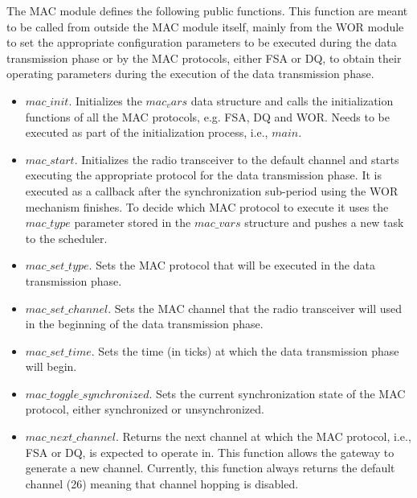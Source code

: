 The MAC module defines the following public functions. This function are meant to be called from outside the MAC module itself, mainly from the WOR module to set the appropriate configuration parameters to be executed during the data transmission phase or by the MAC protocols, either FSA or DQ, to obtain their operating parameters during the execution of the data transmission phase.
\begin{itemize}
\item $mac\_init$. Initializes the $mac_vars$ data structure and calls the initialization functions of all the MAC protocols, e.g. FSA, DQ and WOR. Needs to be executed as part of the initialization process, i.e., $main$.
\item $mac\_start$. Initializes the radio transceiver to the default channel and starts executing the appropriate protocol for the data transmission phase. It is executed as a callback after the synchronization sub-period using the WOR mechanism finishes. To decide which MAC protocol to execute it uses the $mac\_type$ parameter stored in the $mac\_vars$ structure and pushes a new task to the scheduler.
\item $mac\_set\_type$. Sets the MAC protocol that will be executed in the data transmission phase.
\item $mac\_set\_channel$. Sets the MAC channel that the radio transceiver will used in the beginning of the data transmission phase.
\item $mac\_set\_time$. Sets the time (in ticks) at which the data transmission phase will begin.
\item $mac\_toggle\_synchronized$. Sets the current synchronization state of the MAC protocol, either synchronized or unsynchronized.
\item $mac\_next\_channel$. Returns the next channel at which the MAC protocol, i.e., FSA or DQ, is expected to operate in. This function allows the gateway to generate a new channel. Currently, this function always returns the default channel (26) meaning that channel hopping is disabled.
\end{itemize}

